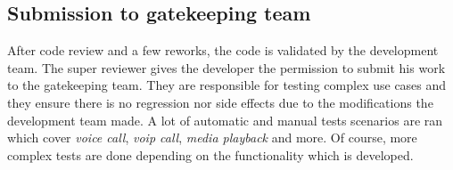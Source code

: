 \subsection{Submission to gatekeeping team}
After code review and a few reworks, the code is validated by the development team.
The super reviewer gives the developer the permission to submit his work to the gatekeeping team.
They are responsible for testing complex use cases and they ensure there is no regression nor side effects
due to the modifications the development team made.
A lot of automatic and manual tests scenarios are ran which cover \emph{voice call}, \emph{voip call}, \emph{media playback}
and more. Of course, more complex tests are done depending on the functionality which is developed.

